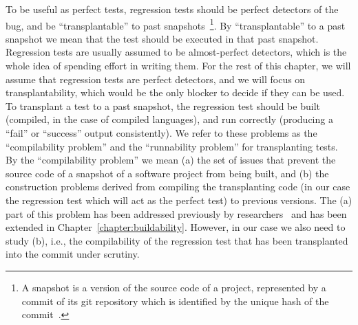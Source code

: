 To be useful as perfect tests, regression tests should be perfect detectors of the bug, and be ``transplantable'' to past snapshots~\footnote{A snapshot is a version of the source code of a project, represented by a commit of its git repository which is identified by the unique hash of the commit~\cite{maes2022revisiting}.}. By ``transplantable'' to a past snapshot we mean that the test should be executed in that past snapshot. Regression tests are usually assumed to be almost-perfect detectors, 
which is the whole idea of spending effort in writing them. For the rest of this chapter, we will assume that regression tests are perfect detectors, and we will focus on transplantability, which would be the only blocker to decide if they can be used. To transplant a test to a past snapshot, 
the regression test should be built (compiled, in the case of compiled languages), and run correctly (producing a ``fail'' or ``success'' output consistently).
We refer to these  problems as the ``compilability problem'' and the ``runnability problem'' for transplanting tests.
By the ``compilability problem'' we mean (a) the set of issues that prevent the source code of a snapshot of a software project from being built, and (b) the construction problems derived from compiling the transplanting code (in our case the regression test which will act as the perfect test) to previous versions. The (a) part of this problem has been addressed previously by researchers~\cite{tufano2017there} and has been extended in Chapter~\ref{chapter:buildability}. However, in our case we also need to study (b), i.e., the compilability of the regression test that has been transplanted into the commit under scrutiny. 
